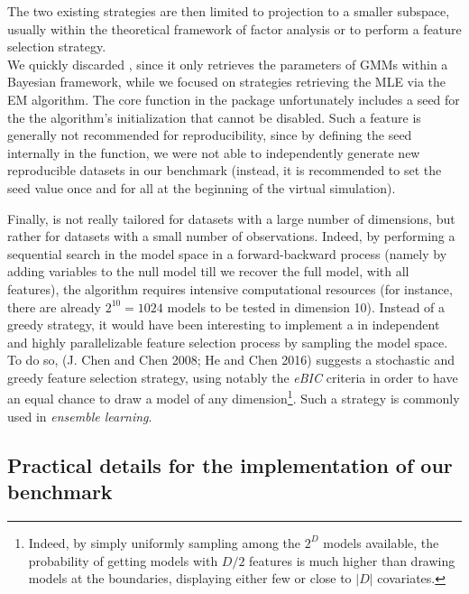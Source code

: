 The two existing strategies are then limited to projection to a smaller subspace, usually within the theoretical framework of factor analysis or to perform a feature selection strategy.\\
We quickly discarded , since it only retrieves the parameters of GMMs within a Bayesian framework, while we focused on strategies retrieving the MLE via the EM algorithm. The core function  in the  package unfortunately includes a seed for the the algorithm's initialization that cannot be disabled. Such a feature is generally not recommended for reproducibility, since by defining the seed internally in the function, we were not able to independently generate new reproducible datasets in our benchmark (instead, it is recommended to set the seed value once and for all at the beginning of the virtual simulation).

Finally,  is not really tailored for datasets with a large number of dimensions, but rather for datasets with a small number of observations. Indeed, by performing a sequential search in the model space in a forward-backward process (namely by adding variables to the null model till we recover the full model, with all features), the algorithm requires intensive computational resources (for instance, there are already \(2^{10}=1024\) models to be tested in dimension 10). Instead of a greedy strategy, it would have been interesting to implement a in independent and highly parallelizable feature selection process by sampling the model space. To do so, (J. Chen and Chen 2008; He and Chen 2016) suggests a stochastic and greedy feature selection strategy, using notably the \emph{eBIC} criteria in order to have an equal chance to draw a model of any dimension\footnote{Indeed, by simply uniformly sampling among the \(2^D\) models available, the probability of getting models with \(D/2\) features is much higher than drawing models at the boundaries, displaying either few or close to \(|D|\) covariates.}. Such a strategy is commonly used in \emph{ensemble learning}.

\color{black}

\hypertarget{practical-details-for-the-implementation-of-our-benchmark}{%
\subsection{Practical details for the implementation of our benchmark}\label{practical-details-for-the-implementation-of-our-benchmark}}

